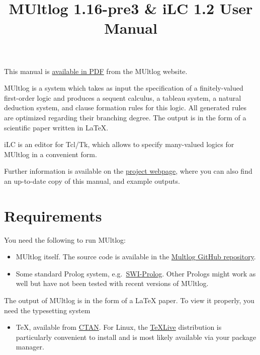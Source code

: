\documentclass[
]{article}
\title{MUltlog 1.16-pre3 \& iLC 1.2 User Manual}
\author{}
\date{}
\providecommand{\tightlist}{%
  \setlength{\itemsep}{0pt}\setlength{\parskip}{0pt}}
\begin{document}
\maketitle

{
\setcounter{tocdepth}{2}
\tableofcontents
}
This manual is \href{https://logic.at/multlog/multlog.pdf}{available in
PDF} from the MUltlog website.

MUltlog is a system which takes as input the specification of a
finitely-valued first-order logic and produces a sequent calculus, a
tableau system, a natural deduction system, and clause formation rules
for this logic. All generated rules are optimized regarding their
branching degree. The output is in the form of a scientific paper
written in LaTeX.

iLC is an editor for Tcl/Tk, which allows to specify many-valued logics
for MUltlog in a convenient form.

Further information is available on the
\href{http://www.logic.at/multlog/}{project webpage}, where you can also
find an up-to-date copy of this manual, and example outputs.

\hypertarget{requirements}{%
\section{Requirements}\label{requirements}}

You need the following to run MUltlog:

\begin{itemize}
\item
  MUltlog itself. The source code is available in the
  \href{https://github.com/rzach/multlog}{Multlog GitHub repository}.
\item
  Some standard Prolog system,
  e.g.~\href{https://www.swi-prolog.org/}{SWI-Prolog}. Other Prologs
  might work as well but have not been tested with recent versions of
  MUltlog.
\end{itemize}

The output of MUltlog is in the form of a LaTeX paper. To view it
properly, you need the typesetting system

\begin{itemize}
\tightlist
\item
  TeX, available from \href{https://ctan.org/}{CTAN}. For Linux, the
  \href{https://www.tug.org/texlive/}{TeXLive} distribution is
  particularly convenient to install and is most likely available via
  your package manager.
\end{itemize}
\end{document}
